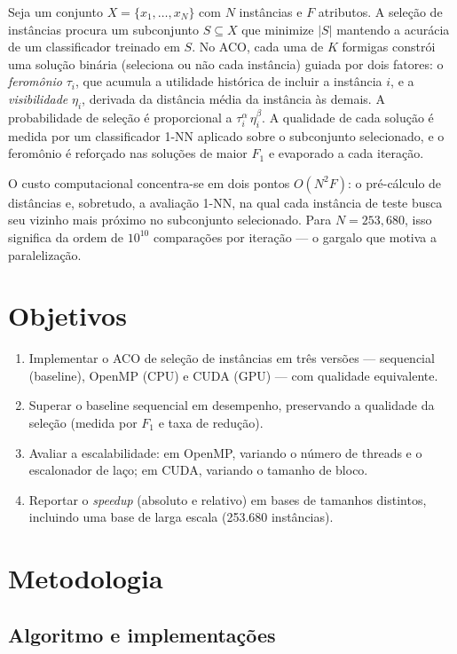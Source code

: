 \documentclass[12pt]{article}
\begin{document}
Seja um conjunto $X = \{x_1, \dots, x_N\}$ com $N$ instâncias e $F$ atributos. A seleção de
instâncias procura um subconjunto $S \subseteq X$ que minimize $|S|$ mantendo a acurácia de um
classificador treinado em $S$. No ACO, cada uma de $K$ formigas constrói uma solução binária
(seleciona ou não cada instância) guiada por dois fatores: o \textit{feromônio} $\tau_i$, que
acumula a utilidade histórica de incluir a instância $i$, e a \textit{visibilidade} $\eta_i$,
derivada da distância média da instância às demais. A probabilidade de seleção é proporcional a
$\tau_i^{\alpha}\,\eta_i^{\beta}$. A qualidade de cada solução é medida por um classificador
1-NN aplicado sobre o subconjunto selecionado, e o feromônio é reforçado nas soluções de maior
$F_1$ e evaporado a cada iteração.

O custo computacional concentra-se em dois pontos $O(N^2 F)$: o pré-cálculo de distâncias e,
sobretudo, a avaliação 1-NN, na qual cada instância de teste busca seu vizinho mais próximo no
subconjunto selecionado. Para $N = 253{,}680$, isso significa da ordem de $10^{10}$ comparações
por iteração --- o gargalo que motiva a paralelização.


\section{Objetivos}

\begin{enumerate}
  \item Implementar o ACO de seleção de instâncias em três versões --- sequencial (baseline),
        OpenMP (CPU) e CUDA (GPU) --- com qualidade equivalente.
  \item Superar o baseline sequencial em desempenho, preservando a qualidade da seleção
        (medida por $F_1$ e taxa de redução).
  \item Avaliar a escalabilidade: em OpenMP, variando o número de threads e o escalonador de
        laço; em CUDA, variando o tamanho de bloco.
  \item Reportar o \textit{speedup} (absoluto e relativo) em bases de tamanhos distintos,
        incluindo uma base de larga escala (253.680 instâncias).
\end{enumerate}


\section{Metodologia}

\subsection{Algoritmo e implementações}
\end{document}
